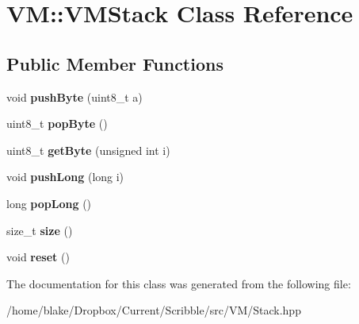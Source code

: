 \hypertarget{class_v_m_1_1_v_m_stack}{\section{V\-M\-:\-:V\-M\-Stack Class Reference}
\label{class_v_m_1_1_v_m_stack}
}
\subsection*{Public Member Functions}
\begin{DoxyCompactItemize}
\item 
\hypertarget{class_v_m_1_1_v_m_stack_a5d738a0cbdc7425f4b03218b36548127}{void {\bfseries push\-Byte} (uint8\-\_\-t a)}\label{class_v_m_1_1_v_m_stack_a5d738a0cbdc7425f4b03218b36548127}

\item 
\hypertarget{class_v_m_1_1_v_m_stack_a7de1e1206b86c1488cb812ab20cdb376}{uint8\-\_\-t {\bfseries pop\-Byte} ()}\label{class_v_m_1_1_v_m_stack_a7de1e1206b86c1488cb812ab20cdb376}

\item 
\hypertarget{class_v_m_1_1_v_m_stack_a5acde10ad80f6562af55204eb237abd8}{uint8\-\_\-t {\bfseries get\-Byte} (unsigned int i)}\label{class_v_m_1_1_v_m_stack_a5acde10ad80f6562af55204eb237abd8}

\item 
\hypertarget{class_v_m_1_1_v_m_stack_ae71cee99566fb18c9d28b63761e80433}{void {\bfseries push\-Long} (long i)}\label{class_v_m_1_1_v_m_stack_ae71cee99566fb18c9d28b63761e80433}

\item 
\hypertarget{class_v_m_1_1_v_m_stack_a4c81b9be069d03e6c1540940ca2fba5f}{long {\bfseries pop\-Long} ()}\label{class_v_m_1_1_v_m_stack_a4c81b9be069d03e6c1540940ca2fba5f}

\item 
\hypertarget{class_v_m_1_1_v_m_stack_a5ae9c3f1460911c8b4fb8957fe856ca8}{size\-\_\-t {\bfseries size} ()}\label{class_v_m_1_1_v_m_stack_a5ae9c3f1460911c8b4fb8957fe856ca8}

\item 
\hypertarget{class_v_m_1_1_v_m_stack_acace9635092448afaf98c0d57f693e5f}{void {\bfseries reset} ()}\label{class_v_m_1_1_v_m_stack_acace9635092448afaf98c0d57f693e5f}

\end{DoxyCompactItemize}


The documentation for this class was generated from the following file\-:\begin{DoxyCompactItemize}
\item 
/home/blake/\-Dropbox/\-Current/\-Scribble/src/\-V\-M/Stack.\-hpp\end{DoxyCompactItemize}
